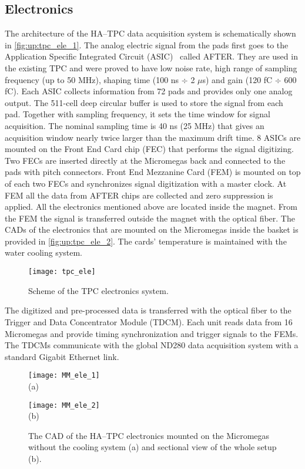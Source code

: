 \documentclass[../main.tex]{subfiles}
\begin{document}
\subsection{Electronics}
\label{sec:up:tpc_ele}
The architecture of the HA--TPC data acquisition system is schematically shown in \autoref{fig:up:tpc_ele_1}. The analog electric signal from the pads first goes to the Application Specific Integrated Circuit (ASIC)~\cite{Baron2007} called AFTER. They are used in the existing TPC and were proved to have low noise rate, high range of sampling frequency (up to 50 MHz), shaping time (100 ns $\div$ 2 $\mu$s) and gain (120 fC $\div$ 600 fC). Each ASIC collects information from 72 pads and provides only one analog output. The 511-cell deep circular buffer is used to store the signal from each pad. Together with sampling frequency, it sets the time window for signal acquisition. The nominal sampling time is 40 ns (25 MHz) that gives an acquisition window nearly twice larger than the maximum drift time. 8 ASICs are mounted on the Front End Card chip (FEC) that performs the signal digitizing. Two FECs are inserted directly at the Micromegas back and connected to the pads with pitch connectors. Front End Mezzanine Card (FEM) is mounted on top of each two FECs and synchronizes signal digitization with a master clock. At FEM all the data from AFTER chips are collected and zero suppression is applied. All the electronics mentioned above are located inside the magnet. From the FEM the signal is transferred outside the magnet with the optical fiber. The CADs of the electronics that are mounted on the Micromegas inside the basket is provided in \autoref{fig:up:tpc_ele_2}. The cards' temperature is maintained with the water cooling system.


\begin{figure}[!ht]
  \centering
  \texttt{[image: tpc\_ele]}
  \caption{Scheme of the TPC electronics system.}
  \label{fig:up:tpc_ele_1}
\end{figure}

The digitized and pre-processed data is transferred with the optical fiber to the Trigger and Data Concentrator Module (TDCM). Each unit reads data from 16 Micromegas and provide timing synchronization and trigger signals to the FEMs. The TDCMs communicate with the global ND280 data acquisition system with a standard Gigabit Ethernet link.

\begin{figure}[!ht]
  \centering
  \begin{minipage}{0.49\linewidth}
    \centering
    \texttt{[image: MM\_ele\_1]} \\ (a)
  \end{minipage}
  \begin{minipage}{0.49\linewidth}
    \centering
    \texttt{[image: MM\_ele\_2]} \\ (b)
  \end{minipage}
  \caption{The CAD of the HA--TPC electronics mounted on the Micromegas without the cooling system (a) and sectional view of the whole setup (b).}
  \label{fig:up:tpc_ele_2}
\end{figure}
\end{document}
